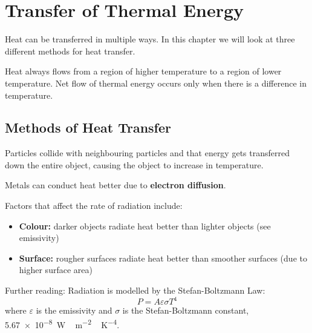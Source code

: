 \documentclass[../main.tex]{subfiles}
\begin{document}
	\section{Transfer of Thermal Energy}
	\begin{preamb}
		Heat can be transferred in multiple ways. In this chapter we will look at three different methods for heat transfer.
	\end{preamb}	
	
	Heat always flows from a region of higher temperature to a region of lower temperature. Net flow of thermal energy occurs only when there is a difference in temperature.
	
	\begin{center}
	\end{center}
	
	\subsection{Methods of Heat Transfer}
	
	Particles collide with neighbouring particles and that energy gets transferred down the entire object, causing the object to increase in temperature.
	
	Metals can conduct heat better due to \textbf{electron diffusion}.
	
	
	
	Factors that affect the rate of radiation include:
	\begin{itemize}
		\item \textbf{Colour:} darker objects radiate heat better than lighter objects (see emissivity)
		\item \textbf{Surface:} rougher surfaces radiate heat better than smoother surfaces (due to higher surface area)
	\end{itemize}
	
	Further reading: Radiation is modelled by the Stefan-Boltzmann Law:
		\[ P = A \varepsilon \sigma T^4 \]
	where \(\varepsilon\) is the emissivity and \(\sigma\) is the Stefan-Boltzmann constant, \SI{5.67e-8}{\watt \, \meter^{-2} \, \kelvin^{-4}}.
\end{document}
